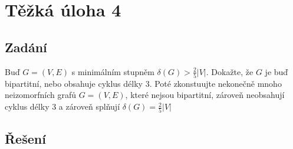 \documentclass[../main.tex]{subfiles}
\begin{document}
\section{Těžká úloha 4}

\subsection{Zadání}
Buď $G=(V,E)$ s minimálním stupněm $\delta(G)> \frac{2}{5}|V|$. Dokažte, že $G$ je buď bipartitní, nebo obsahuje cyklus délky 3. Poté zkonstuujte nekonečně mnoho neizomorfních grafů $G=(V,E)$, které nejsou bipartitní, zároveň neobsahují cyklus délky $3$ a zároveň splňují $\delta (G) = \frac{2}{5}|V|$

\subsection{Řešení}
\end{document}
